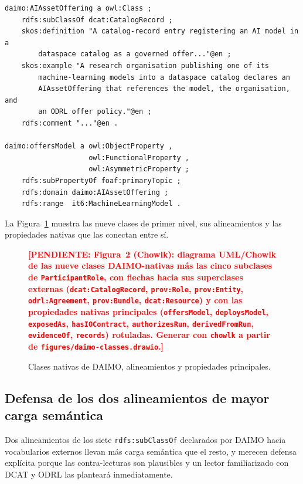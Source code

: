 \documentclass[11pt,a4paper]{article}
\newcommand{\code}[1]{\texttt{#1}}
\newcommand{\TODO}[1]{\textcolor{red}{\textbf{[PENDIENTE: #1]}}}
\begin{document}
\begin{lstlisting}[label=lst:offering,caption={Declaración Turtle de \code{daimo:AIAssetOffering} en el núcleo de DAIMO.}]
daimo:AIAssetOffering a owl:Class ;
    rdfs:subClassOf dcat:CatalogRecord ;
    skos:definition "A catalog-record entry registering an AI model in a
        dataspace catalog as a governed offer..."@en ;
    skos:example "A research organisation publishing one of its
        machine-learning models into a dataspace catalog declares an
        AIAssetOffering that references the model, the organisation, and
        an ODRL offer policy."@en ;
    rdfs:comment "..."@en .

daimo:offersModel a owl:ObjectProperty ,
                    owl:FunctionalProperty ,
                    owl:AsymmetricProperty ;
    rdfs:subPropertyOf foaf:primaryTopic ;
    rdfs:domain daimo:AIAssetOffering ;
    rdfs:range  it6:MachineLearningModel .
\end{lstlisting}

La Figura~\ref{fig:classes} muestra las nueve clases de primer nivel, sus alineamientos y las propiedades nativas que las conectan entre sí.

\begin{figure}[t]
\centering
\TODO{Figura~2 (Chowlk): diagrama UML/Chowlk de las nueve clases DAIMO-nativas más las cinco subclases de \code{ParticipantRole}, con flechas hacia sus superclases externas (\code{dcat:CatalogRecord}, \code{prov:Role}, \code{prov:Entity}, \code{odrl:Agreement}, \code{prov:Bundle}, \code{dcat:Resource}) y con las propiedades nativas principales (\code{offersModel}, \code{deploysModel}, \code{exposedAs}, \code{hasIOContract}, \code{authorizesRun}, \code{derivedFromRun}, \code{evidenceOf}, \code{records}) rotuladas. Generar con \texttt{chowlk} a partir de \texttt{figures/daimo-classes.drawio}.}
\caption{Clases nativas de DAIMO, alineamientos y propiedades principales.}
\label{fig:classes}
\end{figure}

\subsection{Defensa de los dos alineamientos de mayor carga semántica}\label{sec:alignment-defense}

Dos alineamientos de los siete \code{rdfs:subClassOf} declarados por DAIMO hacia vocabularios externos llevan más carga semántica que el resto, y merecen defensa explícita porque las contra-lecturas son plausibles y un lector familiarizado con DCAT y ODRL las planteará inmediatamente.
\end{document}
